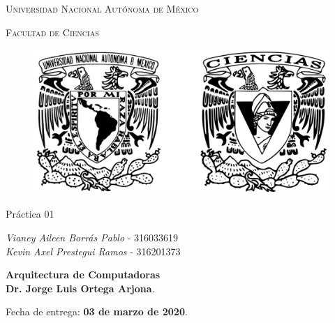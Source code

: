 \documentclass[11pt,letterpaper]{article}
\begin{document}
	
	\begin{titlepage}
		\centering
		
		{\scshape\LARGE Universidad Nacional Autónoma de México \par}
		
		\vspace{1cm}
		{\scshape\Large Facultad de Ciencias\par}
		\vspace{1.5cm}
		
		\begin{figure}[h]
			\centering
			\includegraphics[scale=0.15]{logo.png}
		\end{figure}
	
		\vspace{.8 cm}
		
		{\LARGE Práctica 01 \par}
		
		\vspace{0.5cm}
		\large{\itshape{Vianey Aileen Borrás Pablo}} \small{ - 316033619} \\ \vspace{0.3cm}
		\large{\itshape{Kevin Axel Prestegui Ramos}} \small{ - 316201373} \\ \vspace{0.3cm}
		\vfill
		
		\textbf{Arquitectura de Computadoras}\\
		\textbf{Dr. Jorge Luis Ortega Arjona}. \par
		\vspace{0.5cm}
		Fecha de entrega: \textbf{03 de marzo de 2020}.
	\end{titlepage}
 
\end{document}
